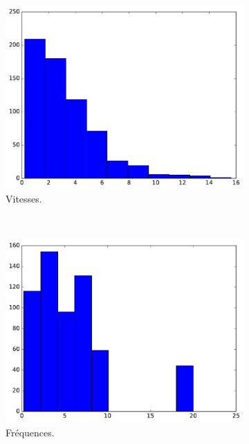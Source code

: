 \begin{appendices}
	\begin{figure}[htbp]
		\begin{subfigure}[t]{\subImgWclicks}
			\centering
			\includegraphics[width=\textwidth]{figures/ch3/wow_filteredSpeed}
			\caption{Vitesses.}
			\label{fig:wow_filteredSpeed}
		\end{subfigure}
		~
		\begin{subfigure}[t]{\subImgWclicks}
			\centering
			\includegraphics[width=\textwidth]{figures/ch3/wow_frequency}
			\caption{Fréquences.}
			\label{fig:wow_frequency}
		\end{subfigure}
		~
		\begin{subfigure}[t]{\subImgWclicks}

\end{subfigure}
\end{figure}
\end{appendices}
